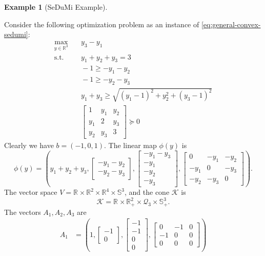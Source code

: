 \documentclass[
]{book}
\theoremstyle{definition}
\theoremstyle{definition}
\newtheorem{example}{Example}[chapter]
\theoremstyle{definition}
\theoremstyle{definition}
\theoremstyle{remark}
\begin{document}
\begin{example}[SeDuMi Example]
\protect\hypertarget{exm:SeDuMiExample}{}\label{exm:SeDuMiExample}

Consider the following optimization problem as an instance of \eqref{eq:general-convex-sedumi}:
\begin{equation}
\begin{split}
\max_{y \in \mathbb{R}^{3}} & \quad y_3 - y_1 \\
\mathrm{s.t.}& \quad y_1 + y_2 + y_3 = 3\\
& \quad -1 \geq -y_1 - y_2 \\
& \quad -1 \geq -y_2 - y_3 \\
& \quad y_1 + y_3 \geq \sqrt{(y_1-1)^2 + y_2^2 + (y_3 -1)^2} \\
& \quad \begin{bmatrix} 1 & y_1 & y_2 \\ y_1 & 2 & y_3 \\ y_2 & y_3 & 3 \end{bmatrix} \succeq 0
\end{split}
\label{eq:sedumi-example}
\end{equation}
Clearly we have \(b = (-1,0,1)\). The linear map \(\phi(y)\) is
\[
\phi(y) = \left( y_1+y_2+y_3,\begin{bmatrix} -y_1 - y_2 \\ - y_2 - y_3 \end{bmatrix}, \begin{bmatrix} - y_1 - y_3 \\ -y_1 \\ -y_2 \\ -y_3 \end{bmatrix}, \begin{bmatrix} 0 & -y_1 & -y_2 \\ -y_1 & 0 & -y_3 \\ -y_2 & -y_3 & 0 \end{bmatrix} \right).
\]
The vector space \(V=\mathbb{R}^{} \times \mathbb{R}^{2} \times \mathbb{R}^{4} \times \mathbb{S}^{3}\), and the cone \(\mathcal{K}\) is
\[
\mathcal{K}= \mathbb{R}^{} \times \mathbb{R}^{2}_{+} \times \mathcal{Q}_3 \times \mathbb{S}^{3}_{+}.
\]
The vectors \(A_1,A_2,A_3\) are
\begin{equation}
\begin{split}
A_1 &= \left( 1,\begin{bmatrix}-1\\0\end{bmatrix}, \begin{bmatrix}-1\\-1\\0\\0\end{bmatrix},\begin{bmatrix}0&-1&0\\-1&0&0\\0&0&0\end{bmatrix} \right)\\

\end{split}
\end{equation}
\end{example}
\end{document}
